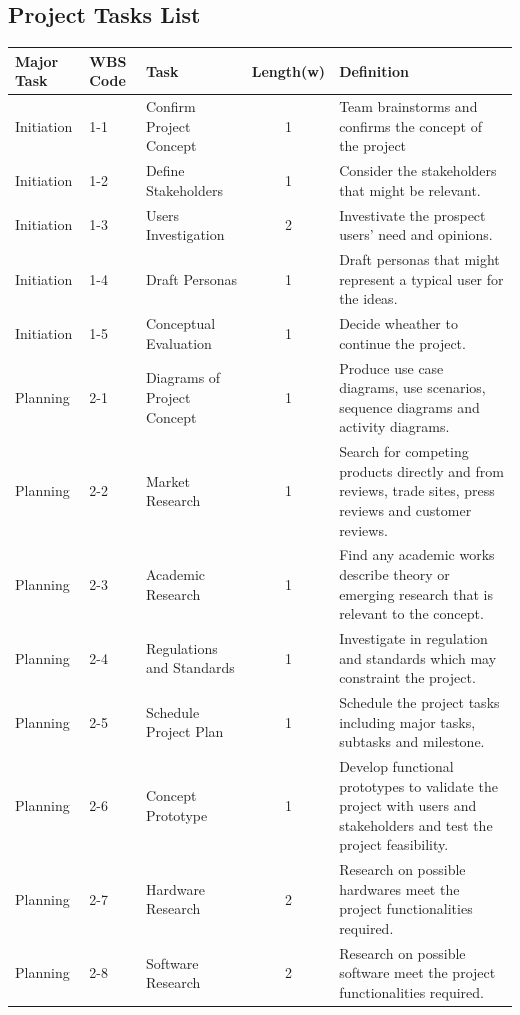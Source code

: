 \documentclass[12pt,a4paper]{article}
\begin{document}
\begin{appendices}
      \section{Project Tasks List}
        \label{appendix:project-tasks-list}
        \begin{longtable}{p{2cm}p{1cm}p{3cm}cp{6cm}}
          \hline
          Major Task & WBS Code & Task & Length(w) & Definition\\
          \hline
          Initiation & 1-1 & Confirm Project Concept & 1 & Team brainstorms and confirms the concept of the project\\\hline
          Initiation & 1-2 & Define Stakeholders & 1 & Consider the stakeholders that might be relevant.\\\hline
          Initiation & 1-3 & Users Investigation & 2 & Investivate the prospect users' need and opinions.\\\hline
          Initiation & 1-4 & Draft Personas & 1 & Draft personas that might represent a typical user for the ideas.\\\hline
          Initiation & 1-5 & Conceptual Evaluation & 1 & Decide wheather to continue the project.\\\hline
          Planning & 2-1 & Diagrams of Project Concept & 1 & Produce use case diagrams, use scenarios, sequence diagrams and activity diagrams.\\\hline
          Planning & 2-2 & Market Research & 1 & Search for competing products directly and from reviews, trade sites, press reviews and customer reviews.\\\hline
          Planning & 2-3 & Academic Research & 1 & Find any academic works describe theory or emerging research that is relevant to the concept.\\\hline
          Planning & 2-4 & Regulations and Standards & 1 & Investigate in regulation and standards which may constraint the project.\\\hline
          Planning & 2-5 & Schedule Project Plan & 1 & Schedule the project tasks including major tasks, subtasks and milestone.\\\hline
          Planning & 2-6 & Concept Prototype & 1 & Develop functional prototypes to validate the project with users and stakeholders and test the project feasibility.\\\hline
          Planning & 2-7 & Hardware Research & 2 & Research on possible hardwares meet the project functionalities required.\\\hline
          Planning & 2-8 & Software Research & 2 & Research on possible software meet the project functionalities required.\\\hline

\end{longtable}
\end{appendices}
\end{document}
